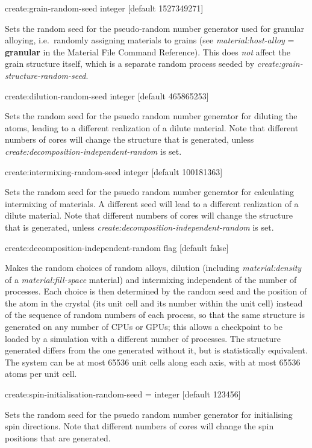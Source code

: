 {\zicf create:grain-random-seed integer [default 1527349271]} Sets the random seed for the pseudo-random number generator used for granular alloying, i.e.\ randomly assigning materials to grains (see \textit{material:host-alloy} = \textbf{granular} in the Material File Command Reference). This does \emph{not} affect the grain structure itself, which is a separate random process seeded by \textit{create:grain-structure-random-seed}.

{\zicf create:dilution-random-seed integer [default 465865253]} Sets the random seed for the psuedo random number generator for diluting the atoms, leading to a different realization of a dilute material. Note that different numbers of cores will change the structure that is generated, unless \textit{create:decomposition-independent-random} is set.

{\zicf create:intermixing-random-seed integer [default 100181363]} Sets the random seed for the psuedo random number generator for calculating intermixing of materials. A different seed will lead to a different realization of a dilute material. Note that different numbers of cores will change the structure that is generated, unless \textit{create:decomposition-independent-random} is set.

{\zicf create:decomposition-independent-random flag [default false]} Makes the random choices of random alloys, dilution (including \textit{material:density} of a \textit{material:fill-space} material) and intermixing independent of the number of processes. Each choice is then determined by the random seed and the position of the atom in the crystal (its unit cell and its number within the unit cell) instead of the sequence of random numbers of each process, so that the same structure is generated on any number of CPUs or GPUs; this allows a checkpoint to be loaded by a simulation with a different number of processes. The structure generated differs from the one generated without it, but is statistically equivalent. The system can be at most 65536 unit cells along each axis, with at most 65536 atoms per unit cell.

{\zicf create:spin-initialisation-random-seed = integer [default 123456]}
Sets the random seed for the psuedo random number generator for initialising
spin directions. Note that different numbers of cores will change the
spin positions that are generated.\\

